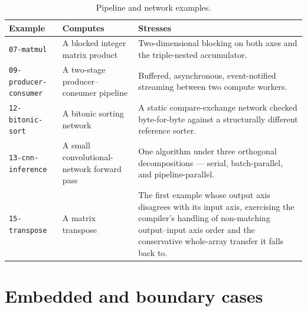 \begin{table}[htbp]
  \centering
  \small
  \begin{tabular}{@{}p{}p{}p{}@{}}
    \toprule
    Example & Computes & Stresses \\
    \midrule
    \texttt{07-matmul} & A blocked integer matrix product & Two-dimensional blocking
      on both axes and the triple-nested accumulator. \\
    \texttt{09-producer-consumer} & A two-stage producer--consumer pipeline &
      Buffered, asynchronous, event-notified streaming between two compute workers. \\
    \texttt{12-bitonic-sort} & A bitonic sorting network & A static compare-exchange
      network checked byte-for-byte against a structurally different reference
      sorter. \\
    \texttt{13-cnn-inference} & A small convolutional-network forward pass & One
      algorithm under three orthogonal decompositions --- serial, batch-parallel, and
      pipeline-parallel. \\
    \texttt{15-transpose} & A matrix transpose & The first example whose output axis
      disagrees with its input axis, exercising the compiler's handling of
      non-matching output--input axis order and the conservative whole-array
      transfer it falls back to. \\
    \bottomrule
  \end{tabular}
  \caption{Pipeline and network examples.}
  \label{tab:examples-pipelines}
\end{table}

\section{Embedded and boundary cases}

